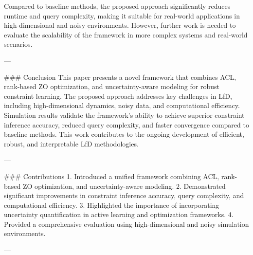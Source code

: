 Compared to baseline methods, the proposed approach significantly reduces runtime and query complexity, making it suitable for real-world applications in high-dimensional and noisy environments. However, further work is needed to evaluate the scalability of the framework in more complex systems and real-world scenarios.  

---

### Conclusion  
This paper presents a novel framework that combines ACL, rank-based ZO optimization, and uncertainty-aware modeling for robust constraint learning. The proposed approach addresses key challenges in LfD, including high-dimensional dynamics, noisy data, and computational efficiency. Simulation results validate the framework's ability to achieve superior constraint inference accuracy, reduced query complexity, and faster convergence compared to baseline methods. This work contributes to the ongoing development of efficient, robust, and interpretable LfD methodologies.  

---

### Contributions  
1. Introduced a unified framework combining ACL, rank-based ZO optimization, and uncertainty-aware modeling.  
2. Demonstrated significant improvements in constraint inference accuracy, query complexity, and computational efficiency.  
3. Highlighted the importance of incorporating uncertainty quantification in active learning and optimization frameworks.  
4. Provided a comprehensive evaluation using high-dimensional and noisy simulation environments.  

---